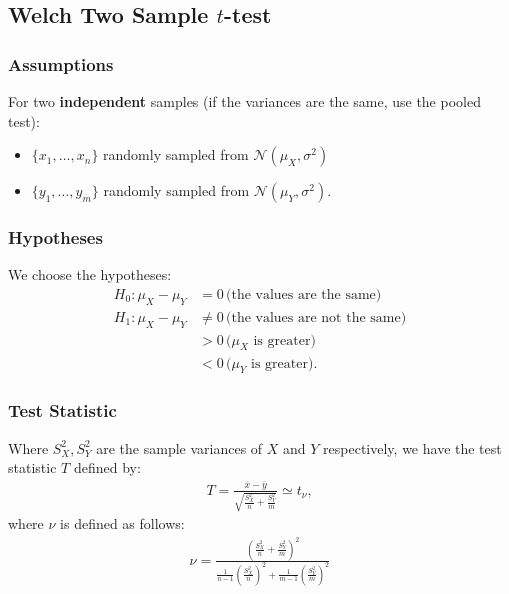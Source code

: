 \documentclass[a4paper, 12pt, twoside]{article}
\begin{document}
\newpage

\subsection{Welch Two Sample $t$-test}

\subsubsection{Assumptions}

For two \textbf{independent} samples (if the variances are the
same, use the pooled test):
\begin{itemize}
    \item $\{x_1, \ldots, x_n\}$ randomly sampled from
          $\mathcal{N}(\mu_X, \sigma^2)$
    \item $\{y_1, \ldots, y_m\}$
          randomly sampled from $\mathcal{N}(\mu_Y, \sigma^2)$.
\end{itemize}

\subsubsection{Hypotheses}

We choose the hypotheses:
\begin{align*}
    H_0 : \mu_X - \mu_Y & = 0 \, \text{(the values are the same)}        \\
    H_1 : \mu_X - \mu_Y & \neq 0 \, \text{(the values are not the same)} \\
                        & > 0 \, \text{($\mu_X$ is greater)}             \\
                        & < 0 \, \text{($\mu_Y$ is greater)}.
\end{align*}

\subsubsection{Test Statistic}

Where $S_X^2, S_Y^2$ are the sample variances of $X$ and $Y$
respectively, we have the test statistic $T$ defined by:
\begin{align*}
    T = \frac{\overline{x} - \overline{y}}
    {\sqrt{\frac{S_X^2}{n} + \frac{S_Y^2}{m}}} \simeq t_\nu,
\end{align*}
where $\nu$ is defined as follows:
\begin{align*}
    \nu = \frac{(\frac{S_X^2}{n} + \frac{S_Y^2}{m})^2}
    {\frac{1}{n - 1}(\frac{S_X^2}{n})^2
        + \frac{1}{m - 1}(\frac{S_Y^2}{m})^2}
\end{align*}
\end{document}
